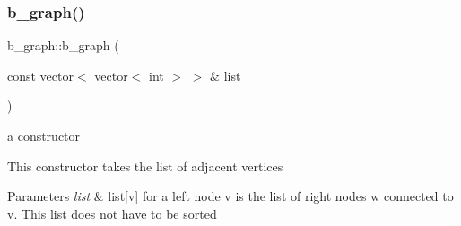 \subsubsection{\texorpdfstring{b\+\_\+graph()}{b\_graph()}\hspace{0.1cm}{\footnotesize\ttfamily [4/4]}}
{\footnotesize\ttfamily b\+\_\+graph\+::b\+\_\+graph (\begin{DoxyParamCaption}\item[{const vector$<$ vector$<$ int $>$ $>$ \&}]{list }\end{DoxyParamCaption})}



a constructor 

This constructor takes the list of adjacent vertices 
\begin{DoxyParams}{Parameters}
{\em list} & list\mbox{[}v\mbox{]} for a left node v is the list of right nodes w connected to v. This list does not have to be sorted \\
\hline
\end{DoxyParams}

